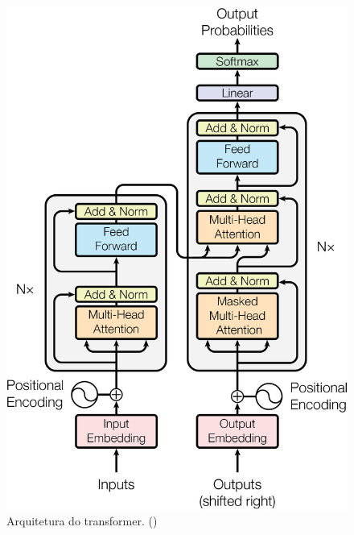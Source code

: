 
\begin{figure}
  \begin{minipage}[b]{0.6\textwidth}
    \includegraphics[scale=0.5]{images/ModalNet-21}
    \caption{Arquitetura do transformer. ()}
    \label{fig:transformer-arch}
  \end{minipage}
  \begin{minipage}[b]{0.5\textwidth}

\end{minipage}
\end{figure}
